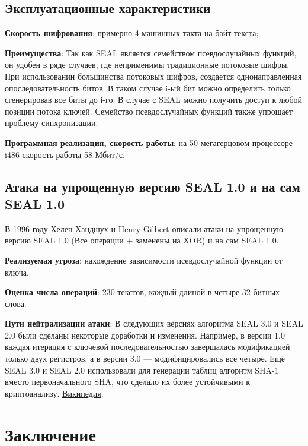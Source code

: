 \documentclass[colorthm]{../civarticle}
\begin{document}
\subsection{Эксплуатационные характеристики}

\textbf{Скорость шифрования}: примерно 4 машинных такта на байт текста;

\textbf{Преимущества}: Так как SEAL является семейством псевдослучайных функций, он удобен в ряде случаев, где неприменимы традиционные потоковые шифры. При использовании большинства потоковых шифров, создается однонаправленная опоследовательность битов. В таком случае i-ый бит можно определить только сгенерировав все биты до i-го. В случае с SEAL можно получить доступ к любой позиции потока ключей. Семейство псевдослучайных функций также упрощает проблему синхронизации. 


\textbf{Программная реализация, скорость работы}: на 50-мегагерцовом процессоре i486 скорость работы 58 Мбит/с.

\subsection{Атака на упрощенную версию SEAL 1.0 и на сам SEAL 1.0}


 В 1996 году Хелен Хандшух и Henry Gilbert описали атаки на упрощенную версию SEAL 1.0 (Все операции $+$ заменены на ХOR) и на сам SEAL 1.0. ~\cite{atack}

\textbf{Реализуемая угроза}: нахождение зависимости псевдослучайной функции от ключа. 

\textbf{Оценка числа операций}: 230 текстов, каждый длиной в четыре 32-битных слова.
 
\textbf{Пути нейтрализации атаки}: В следующих версиях алгоритма SEAL 3.0 и SEAL 2.0 были сделаны некоторые доработки и изменения. Например, в версии 1.0 каждая итерация с ключевой последовательностью завершалась модификацией только двух регистров, а в версии 3.0 — модифицировались все четыре. Ещё SEAL 3.0 и SEAL 2.0 использовали для генерации таблиц алгоритм SHA-1 вместо первоначального SHA, что сделало их более устойчивыми к криптоанализу. \href{https://ru.wikipedia.org/wiki/%D0%A5%D0%B0%D0%BD%D0%B4%D1%88%D1%83%D1%85,_%D0%A5%D0%B5%D0%BB%D0%B5%D0%BD#%D0%90%D1%82%D0%B0%D0%BA%D0%B0_%D0%BD%D0%B0_SEAL}{Википедия}.


\section{Заключение}
\end{document}
